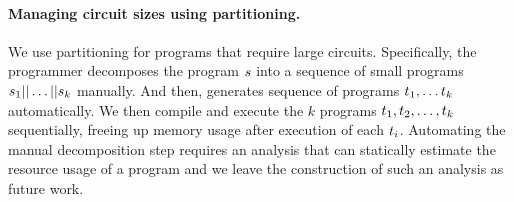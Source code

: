 %

\paragraph{Managing circuit sizes using partitioning.}
We use partitioning for programs that require large
circuits. Specifically, the programmer decomposes the program
$s$ into a sequence of small programs
$s_1||\dots||s_k$ manually. And then, \tool generates
sequence of programs $t_1,\dots t_k$ automatically. We then
compile and execute the $k$ programs
$t_1,t_2,\ldots,t_k$ sequentially, freeing up memory
usage after execution of each $t_i$.
Automating the manual decomposition step requires an analysis that can 
statically estimate the resource usage of a \tool program and we leave
the construction of such an analysis as future work. 
